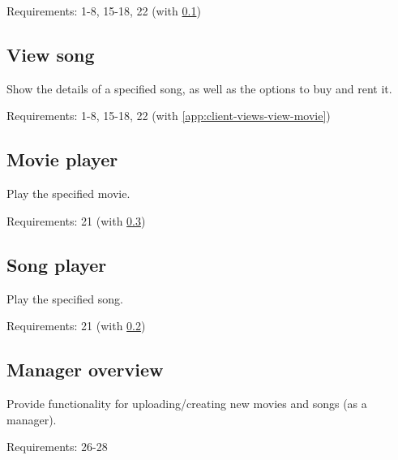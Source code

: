 Requirements: 1-8, 15-18, 22 (with \ref{app:client-views-view-song})

\subsection{View song}
\label{app:client-views-view-song}
Show the details of a specified song, as well as the options to buy and rent it.

Requirements: 1-8, 15-18, 22 (with \ref{app:client-views-view-movie})

\subsection{Movie player}
\label{app:client-views-movie-player}
Play the specified movie.

Requirements:  21 (with \ref{app:client-views-song-player})

\subsection{Song player}
\label{app:client-views-song-player}
Play the specified song.

Requirements: 21 (with \ref{app:client-views-movie-player})

\subsection{Manager overview}
Provide functionality for uploading/creating new movies and songs (as a manager).

Requirements: 26-28

